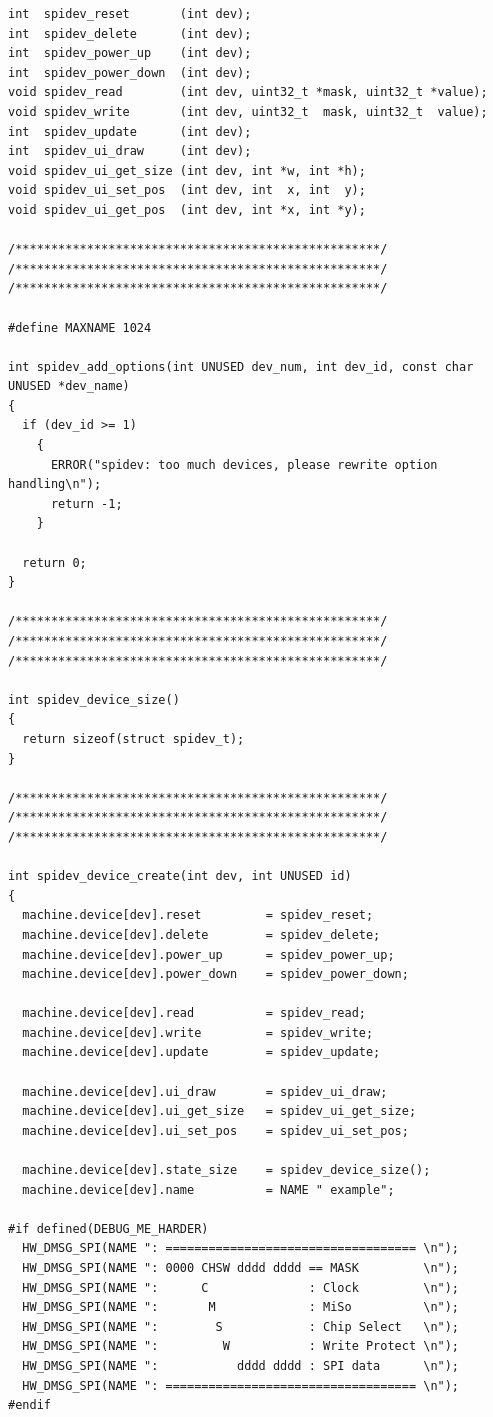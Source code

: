 \documentclass[a4paper,10pt]{report}
\begin{document}
\begin{verbatim}
int  spidev_reset       (int dev);
int  spidev_delete      (int dev);
int  spidev_power_up    (int dev);
int  spidev_power_down  (int dev);
void spidev_read        (int dev, uint32_t *mask, uint32_t *value);
void spidev_write       (int dev, uint32_t  mask, uint32_t  value);
int  spidev_update      (int dev);
int  spidev_ui_draw     (int dev);
void spidev_ui_get_size (int dev, int *w, int *h);
void spidev_ui_set_pos  (int dev, int  x, int  y);
void spidev_ui_get_pos  (int dev, int *x, int *y);

/***************************************************/
/***************************************************/
/***************************************************/

#define MAXNAME 1024

int spidev_add_options(int UNUSED dev_num, int dev_id, const char UNUSED *dev_name)
{
  if (dev_id >= 1)
    {
      ERROR("spidev: too much devices, please rewrite option handling\n");
      return -1;
    }

  return 0;
}

/***************************************************/
/***************************************************/
/***************************************************/

int spidev_device_size()
{
  return sizeof(struct spidev_t);
}

/***************************************************/
/***************************************************/
/***************************************************/

int spidev_device_create(int dev, int UNUSED id)
{
  machine.device[dev].reset         = spidev_reset;
  machine.device[dev].delete        = spidev_delete;
  machine.device[dev].power_up      = spidev_power_up;
  machine.device[dev].power_down    = spidev_power_down;

  machine.device[dev].read          = spidev_read;
  machine.device[dev].write         = spidev_write;
  machine.device[dev].update        = spidev_update;

  machine.device[dev].ui_draw       = spidev_ui_draw;
  machine.device[dev].ui_get_size   = spidev_ui_get_size;
  machine.device[dev].ui_set_pos    = spidev_ui_set_pos;

  machine.device[dev].state_size    = spidev_device_size();
  machine.device[dev].name          = NAME " example";

#if defined(DEBUG_ME_HARDER)
  HW_DMSG_SPI(NAME ": =================================== \n");
  HW_DMSG_SPI(NAME ": 0000 CHSW dddd dddd == MASK         \n");
  HW_DMSG_SPI(NAME ":      C              : Clock         \n");
  HW_DMSG_SPI(NAME ":       M             : MiSo          \n");
  HW_DMSG_SPI(NAME ":        S            : Chip Select   \n");
  HW_DMSG_SPI(NAME ":         W           : Write Protect \n");
  HW_DMSG_SPI(NAME ":           dddd dddd : SPI data      \n");
  HW_DMSG_SPI(NAME ": =================================== \n");
#endif


\end{verbatim}
\end{document}

